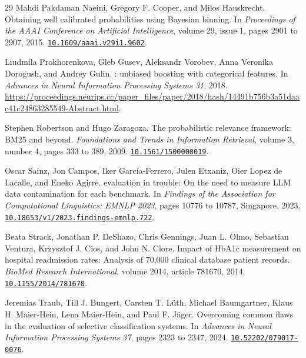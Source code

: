 \documentclass[11pt,letterpaper]{article}
\newcommand{\doi}[1]{\href{https://doi.org/#1}{\nolinkurl{#1}}}
\begin{document}
\begin{thebibliography}{29}
Mahdi Pakdaman Naeini, Gregory F. Cooper, and Milos Hauskrecht.
\newblock Obtaining well calibrated probabilities using {Bayesian} binning.
\newblock In \emph{Proceedings of the AAAI Conference on Artificial Intelligence}, volume 29, issue 1, pages 2901 to 2907, 2015.
\newblock \doi{10.1609/aaai.v29i1.9602}.

Liudmila Prokhorenkova, Gleb Gusev, Aleksandr Vorobev, Anna Veronika Dorogush, and Andrey Gulin.
: unbiased boosting with categorical features.
\newblock In \emph{Advances in Neural Information Processing Systems 31}, 2018.
\newblock \url{https://proceedings.neurips.cc/paper_files/paper/2018/hash/14491b756b3a51daac41c24863285549-Abstract.html}.

Stephen Robertson and Hugo Zaragoza.
\newblock The probabilistic relevance framework: {BM25} and beyond.
\newblock \emph{Foundations and Trends in Information Retrieval}, volume 3, number 4, pages 333 to 389, 2009.
\newblock \doi{10.1561/1500000019}.

Oscar Sainz, Jon Campos, Iker Garc{\'i}a-Ferrero, Julen Etxaniz, Oier Lopez de Lacalle, and Eneko Agirre.
 evaluation in trouble: On the need to measure {LLM} data contamination for each benchmark.
\newblock In \emph{Findings of the Association for Computational Linguistics: EMNLP 2023}, pages 10776 to 10787, Singapore, 2023.
\newblock \doi{10.18653/v1/2023.findings-emnlp.722}.

Beata Strack, Jonathan P. DeShazo, Chris Gennings, Juan L. Olmo, Sebastian Ventura, Krzysztof J. Cios, and John N. Clore.
\newblock Impact of {HbA1c} measurement on hospital readmission rates: Analysis of 70,000 clinical database patient records.
\newblock \emph{BioMed Research International}, volume 2014, article 781670, 2014.
\newblock \doi{10.1155/2014/781670}.

Jeremias Traub, Till J. Bungert, Carsten T. L{\"u}th, Michael Baumgartner, Klaus H. Maier-Hein, Lena Maier-Hein, and Paul F. J{\"a}ger.
\newblock Overcoming common flaws in the evaluation of selective classification systems.
\newblock In \emph{Advances in Neural Information Processing Systems 37}, pages 2323 to 2347, 2024.
\newblock \doi{10.52202/079017-0076}.


\end{thebibliography}
\end{document}
